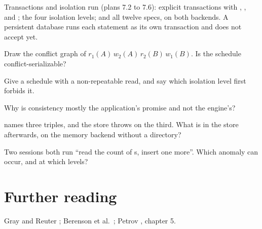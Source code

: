 \begin{status}
Transactions and isolation run (plans 7.2 to 7.6): explicit transactions with
, , and
; the four isolation levels; and all twelve specs,
on both backends. A persistent database runs each statement as its own
transaction and does not accept  yet.
\end{status}

\begin{checkyourself}
\item Draw the conflict graph of $r_1(A)\, w_2(A)\, r_2(B)\, w_1(B)$. Is the schedule conflict-serializable?
\item Give a schedule with a non-repeatable read, and say which isolation level first forbids it.
\item Why is consistency mostly the application's promise and not the engine's?
\item {} names three triples, and the store throws on the third. What is in the store afterwards, on the memory backend without a directory?
\item Two sessions both run ``read the count of s, insert one more''. Which anomaly can occur, and at which levels?
\end{checkyourself}

\section*{Further reading}
Gray and Reuter \cite{grayreuter}; Berenson et al.\ \cite{berenson}; Petrov
\cite{petrov}, chapter 5.
